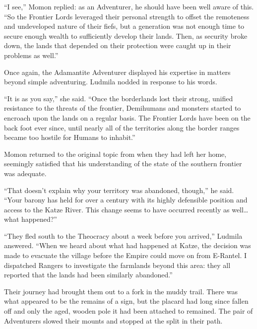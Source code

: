  

“I see,” Momon replied: as an Adventurer, he should have been well aware of this. “So the Frontier Lords leveraged their personal strength to offset the remoteness and undeveloped nature of their fiefs, but a generation was not enough time to secure enough wealth to sufficiently develop their lands. Then, as security broke down, the lands that depended on their protection were caught up in their problems as well.”

 

Once again, the Adamantite Adventurer displayed his expertise in matters beyond simple adventuring. Ludmila nodded in response to his words.

 

“It is as you say,” she said. “Once the borderlands lost their strong, unified resistance to the threats of the frontier, Demihumans and monsters started to encroach upon the lands on a regular basis. The Frontier Lords have been on the back foot ever since, until nearly all of the territories along the border ranges became too hostile for Humans to inhabit.”

 

Momon returned to the original topic from when they had left her home, seemingly satisfied that his understanding of the state of the southern frontier was adequate.

 

“That doesn’t explain why your territory was abandoned, though,” he said. “Your barony has held for over a century with its highly defensible position and access to the Katze River. This change seems to have occurred recently as well…what happened?”

 

“They fled south to the Theocracy about a week before you arrived,” Ludmila answered. “When we heard about what had happened at Katze, the decision was made to evacuate the village before the Empire could move on from E-Rantel. I dispatched Rangers to investigate the farmlands beyond this area: they all reported that the lands had been similarly abandoned.”

 

Their journey had brought them out to a fork in the muddy trail. There was what appeared to be the remains of a sign, but the placard had long since fallen off and only the aged, wooden pole it had been attached to remained. The pair of Adventurers slowed their mounts and stopped at the split in their path.

 

